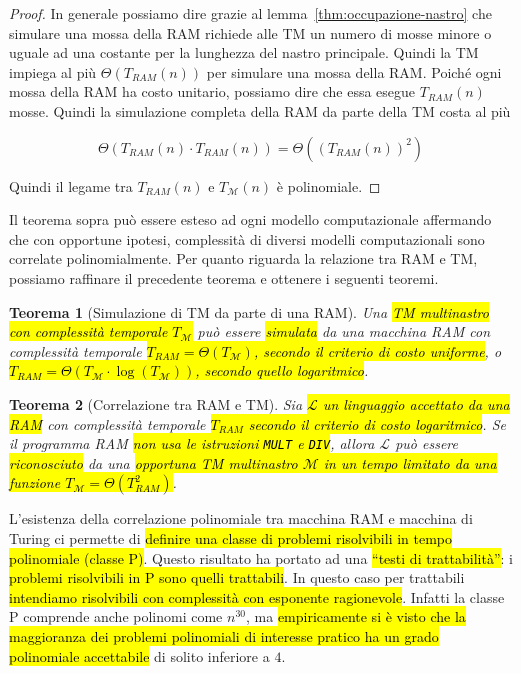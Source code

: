 \documentclass[a4paper,11pt,twoside]{article}
\theoremstyle{plain}
\newtheorem{thm}{Teorema}[section]
\theoremstyle{definition}
\theoremstyle{remark}
\begin{document}
\begin{proof}
  In generale possiamo dire grazie al lemma~\ref{thm:occupazione-nastro} che
  simulare una mossa della RAM richiede alle TM un numero di mosse minore o
  uguale ad una costante per la lunghezza del nastro principale. Quindi la TM
  impiega al più $\Theta(T_{RAM}(n))$ per simulare una mossa della RAM\@. Poiché
  ogni mossa della RAM ha costo unitario, possiamo dire che essa esegue
  $T_{RAM}(n)$ mosse. Quindi la simulazione completa della RAM da parte della TM
  costa al più

  \[
    \Theta(T_{RAM}(n) \cdot T_{RAM}(n)) = \Theta({(T_{RAM}(n))}^2)
  \]

  Quindi il legame tra $T_{RAM}(n)$ e $T_\mathcal{M}(n)$ è polinomiale.
\end{proof}

Il teorema sopra può essere esteso ad ogni modello computazionale affermando che
con opportune ipotesi, complessità di diversi modelli computazionali sono
correlate polinomialmente. Per quanto riguarda la relazione tra RAM e TM,
possiamo raffinare il precedente teorema e ottenere i seguenti teoremi.

\begin{thm}[Simulazione di TM da parte di una RAM]\label{thm:sim-tm-ram}
  Una \hl{TM multinastro con complessità temporale $T_\mathcal{M}$} può essere
  \hl{simulata} da una macchina RAM con complessità temporale \hl{$T_{RAM} =
  \Theta(T_\mathcal{M})$, secondo il criterio di costo uniforme}, o \hl{$T_{RAM}
  = \Theta(T_\mathcal{M} \cdot \log(T_\mathcal{M}))$, secondo quello
  logaritmico}.
\end{thm}

\begin{thm}[Correlazione tra RAM e TM]\label{thm:corr-ram-tm}
  Sia \hl{$\mathcal{L}$ un linguaggio accettato da una RAM} con complessità
  temporale \hl{$T_{RAM}$ secondo il criterio di costo logaritmico}. Se il
  programma RAM \hl{non usa le istruzioni \texttt{MULT} e \texttt{DIV}}, allora
  $\mathcal{L}$ può essere \hl{riconosciuto} da una \hl{opportuna TM multinastro
  $\mathcal{M}$ in un tempo limitato da una funzione $T_\mathcal{M} =
  \Theta(T_{RAM}^2)$}.
\end{thm}

L'esistenza della correlazione polinomiale tra macchina RAM e macchina di Turing
ci permette di \hl{definire una classe di problemi risolvibili in tempo
polinomiale (classe P)}. Questo risultato ha portato ad una \hl{``testi di
trattabilità''}: i \hl{problemi risolvibili in P sono quelli trattabili}. In
questo caso per trattabili \hl{intendiamo risolvibili con complessità con
esponente ragionevole}. Infatti la classe P comprende anche polinomi come
$n^{30}$, ma \hl{empiricamente si è visto che la maggioranza dei problemi
polinomiali di interesse pratico ha un grado polinomiale accettabile} di solito
inferiore a $4$.
\end{document}
